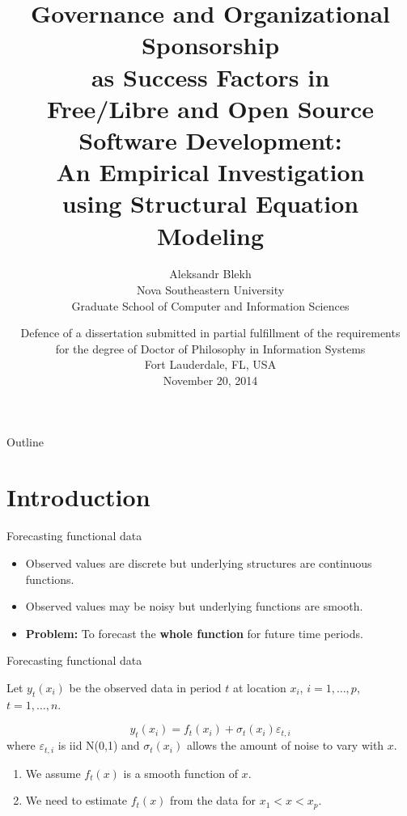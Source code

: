 \documentclass[12pt,xcolor=dvipsnames]{beamer}
\title{Governance and Organizational Sponsorship\\
       as Success Factors in\\
       Free/Libre and Open Source Software Development:\\
       An Empirical Investigation\\
       using Structural Equation Modeling}
\author{
  Aleksandr Blekh\\
  Nova Southeastern University\\
  Graduate School of Computer and Information Sciences}
\date{
  Defence of a dissertation submitted in partial fulfillment of the requirements\\
  for the degree of Doctor of Philosophy in Information Systems\\
  Fort Lauderdale, FL, USA\\
  November 20, 2014}
\begin{document}
 
\begin{frame}
\titlepage
\end{frame}
 
\begin{frame}{Outline}
\tableofcontents
\end{frame}
 
\section{Introduction}
 
\begin{frame}{Forecasting functional data}
\begin{itemize}[<+-| alert@+>]
\item Observed values are discrete but underlying structures are 
continuous functions.
\item Observed values may be noisy but underlying functions are 
smooth.
\item \textbf{Problem:} To forecast the \textbf{whole function} for 
future time periods.
\end{itemize}
\end{frame}
 
\begin{frame}{Forecasting functional data}
 
Let $y_t(x_i)$ be the observed data in period $t$ at location $x_i$, 
$i=1,\dots,p$, $t=1,\dots,n$.
\pause
 
\begin{block}{}
\[
y_t(x_i) = f_t(x_i) + \sigma_t(x_i)\varepsilon_{t,i}
\]
where $\varepsilon_{t,i}$ is iid N(0,1) and $\sigma_t(x_i)$ allows the 
amount of noise to vary with $x$.
\end{block}
\pause
 
\begin{enumerate}[<+-| alert@+>]
\item We assume $f_t(x)$ is a smooth function of $x$.
\item We need to estimate $f_t(x)$ from the data for $x_1 < x < x_p$.
\end{enumerate}
\end{frame}
 
\end{document}
